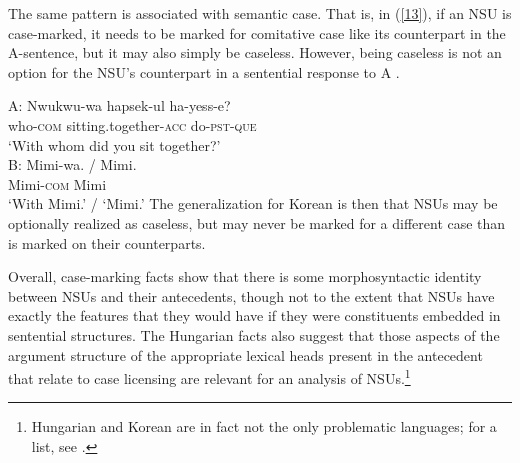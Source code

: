 {%
The same pattern is associated with semantic case. That is, in (\ref{13}), if an NSU is case-marked, it needs
to be marked for comitative case like its counterpart in the A-sentence, but it may also simply be caseless. However,  
being caseless is not an option for the NSU's counterpart in a sentential response to A \citep{Kim2015}.

\ea
A:
\gll Nwukwu-wa          hapsek-ul                     ha-yess-e?\\
     who-\textsc{com}   sitting.together-\textsc{acc} do-\textsc{pst}-\textsc{que}\\
\glt  `With whom did you sit together?'\\

B:
\gll Mimi-wa. 			/ Mimi.\\
     Mimi-\textsc{com} {} Mimi\\
\glt `With Mimi.' / `Mimi.' \label{13}\z
%
The generalization for Korean is then that NSUs may be optionally realized as caseless, but may never be marked for a different case than is marked on their counterparts.

Overall, case-marking facts show that there is some morphosyntactic identity between NSUs and their antecedents, though not to the extent that NSUs have exactly the features that they would have if they were constituents embedded in sentential structures. The Hungarian facts also suggest that those aspects of the argument structure of the appropriate lexical heads present in the antecedent that relate to case licensing are relevant for an analysis of NSUs.\footnote{Hungarian and Korean are in fact not the only problematic languages; for a list, see \citet{Vicente2015}.}

}
